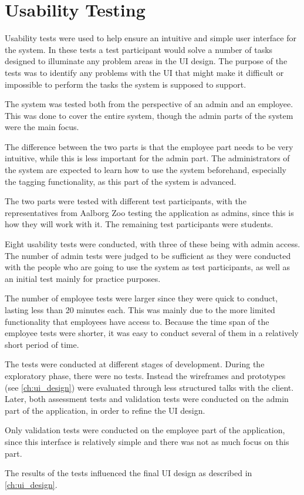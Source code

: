 \section{Usability Testing} \label{sc:UsabilityTesting}
Usability tests were used to help ensure an intuitive and simple user interface for the system. In these tests a test participant would solve a number of tasks designed to illuminate any problem areas in the UI design. The purpose of the tests was to identify any problems with the UI that might make it difficult or impossible to perform the tasks the system is supposed to support.
\par
The system was tested both from the perspective of an admin and an employee. This was done to cover the entire system, though the admin parts of the system were the main focus. 
\par
The difference between the two parts is that the employee part needs to be very intuitive, while this is less important for the admin part. The administrators of the system are expected to learn how to use the system beforehand, especially the tagging functionality, as this part of the system is advanced.
\par
The two parts were tested with different test participants, with the representatives from Aalborg Zoo testing the application as admins, since this is how they will work with it. The remaining test participants were students.
\par
Eight usability tests were conducted, with three of these being with admin access. The number of admin tests were judged to be sufficient as they were conducted with the people who are going to use the system as test participants, as well as an initial test mainly for practice purposes. 
\par
The number of employee tests were larger since they were quick to conduct, lasting less than 20 minutes each. This was mainly due to the more limited functionality that employees have access to. Because the time span of the employee tests were shorter, it was easy to conduct several of them in a relatively short period of time. 
\par
The tests were conducted at different stages of development. During the exploratory phase, there were no tests. Instead the wireframes and prototypes (see \autoref{ch:ui_design}) were evaluated through less structured talks with the client. Later, both assessment tests and validation tests were conducted on the admin part of the application, in order to refine the UI design. 
\par
Only validation tests were conducted on the employee part of the application, since this interface is relatively simple and there was not as much focus on this part. 
\par
The results of the tests influenced the final UI design as described in \autoref{ch:ui_design}.


